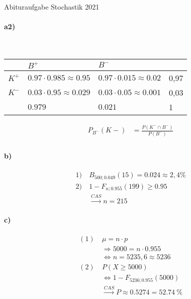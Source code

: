 \documentclass[12pt,a4paper]{report}
\begin{document}
	\noindent
	\Large
	Abituraufgabe Stochastik 2021
	\large
	\paragraph{a2)} \mbox{} \\
	\begin{tabularx}{0.74\textwidth}{|X|X|X|X|}
		\hline
		& $B^+$ & $B^-$ & \\
		\hline
		$K^+$ & $0.97 \cdot 0.985 \approx 0.95$& $0.97 \cdot 0.015 \approx 0.02$& 0,97 \\
		\hline
		$K^-$ & $0.03\cdot 0.95 \approx 0.029$ &$0.03\cdot 0.05 \approx 0.001$& 0,03 \\
		\hline
		&$0.979$&$0.021$& 1 \\
		\hline
	\end{tabularx}
	\begin{align*}
		P_{B^-} (K-) &= \frac{P(K^-\cap B^-)}{P(B^-)} \\
	\end{align*}
	\paragraph{b)}	
	\begin{align*}
		1)&\ B_{500;0.049} (15) = 0.024 \approx 2,4\% \\
		2)&\ 1-F_{n;0.955}(199) \geq 0.95 \\
		&\ \xrightarrow{CAS} n = 215
	\end{align*}
	\paragraph{c)}
	\begin{align*}
		(1)&\ \mu = n \cdot p \\
		&\ \Rightarrow 5000 = n \cdot 0.955 \\
		&\ \Leftrightarrow n = 5235,6 \approx 5236 \\
		(2)&\ P(X \geq 5000) \\
		&\ \Leftrightarrow 1-F_{5236;0.955}(5000) \\
		&\ \xrightarrow{CAS} P\approx 0.5274 = 52.74\ \%
	\end{align*}
\end{document}
